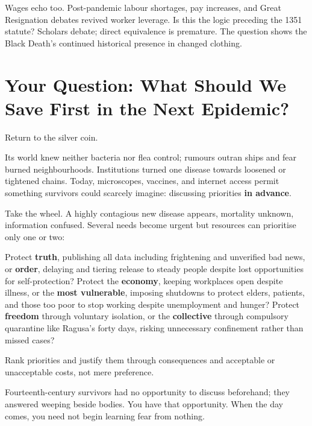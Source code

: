 Wages echo too. Post-pandemic labour shortages, pay increases, and Great Resignation debates revived worker leverage. Is this the logic preceding the 1351 statute? Scholars debate; direct equivalence is premature. The question shows the Black Death's continued historical presence in changed clothing.

\section[Your Question: What Comes First?]{Your Question: What Should We Save First in the Next Epidemic?}
Return to the silver coin.

Its world knew neither bacteria nor flea control; rumours outran ships and fear burned neighbourhoods. Institutions turned one disease towards loosened or tightened chains. Today, microscopes, vaccines, and internet access permit something survivors could scarcely imagine: discussing priorities \textbf{in advance}.

Take the wheel. A highly contagious new disease appears, mortality unknown, information confused. Several needs become urgent but resources can prioritise only one or two:

Protect \textbf{truth}, publishing all data including frightening and unverified bad news, or \textbf{order}, delaying and tiering release to steady people despite lost opportunities for self-protection? Protect the \textbf{economy}, keeping workplaces open despite illness, or the \textbf{most vulnerable}, imposing shutdowns to protect elders, patients, and those too poor to stop working despite unemployment and hunger? Protect \textbf{freedom} through voluntary isolation, or the \textbf{collective} through compulsory quarantine like Ragusa's forty days, risking unnecessary confinement rather than missed cases?

Rank priorities and justify them through consequences and acceptable or unacceptable costs, not mere preference.

Fourteenth-century survivors had no opportunity to discuss beforehand; they answered weeping beside bodies. You have that opportunity. When the day comes, you need not begin learning fear from nothing.

